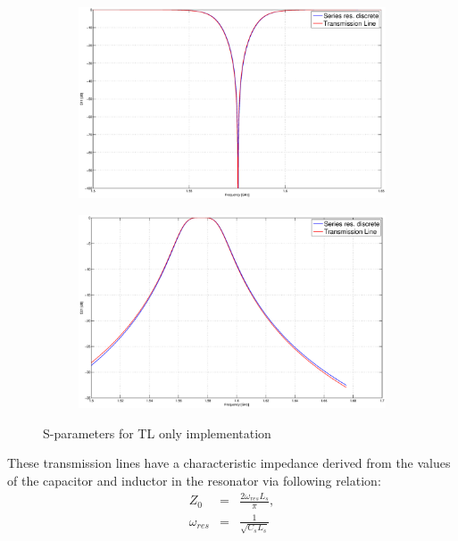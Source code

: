 \documentclass[a4paper]{article}        %
\begin{document}
  \begin{figure}[H]
  \centering
  	\begin{subfigure}{0.7\textwidth}
  	\includegraphics[width=\textwidth]{fig/Filter/2nd_order/plots/S11_TL.eps}
  	\end{subfigure}
  	\begin{subfigure}{0.7\textwidth}
  	\includegraphics[width=\textwidth]{fig/Filter/2nd_order/plots/S21_TL.eps}
  	\end{subfigure}
  	\caption{S-parameters for TL only implementation}
  	\label{fig:filter_spar_TL}
  \end{figure}

  These transmission lines have a characteristic impedance derived from the values of the capacitor and inductor in the resonator via following relation\cite{coupled_lines}: 
  \begin{eqnarray*}
    Z_0 &=& \frac{2 \omega_{res} L_s}{\pi},\\
    \omega_{res} &=& \frac{1}{\sqrt{C_s L_s}}
  \end{eqnarray*}
\end{document}
